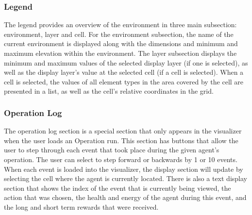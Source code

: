 \subsubsection{Legend}
The legend provides an overview of the environment in three main subsection: environment, layer and cell.
For the environment subsection, the name of the current environment is displayed along with the dimensions and minimum and maximum elevation within the environment.
The layer subsection displays the minimum and maximum values of the selected display layer (if one is selected), as well as the display layer's value at the selected cell (if a cell is selected).
When a cell is selected, the values of all element types in the area covered by the cell are presented in a list, as well as the cell's relative coordinates in the grid.


\subsubsection{Operation Log}
The operation log section is a special section that only appears in the visualizer when the user loads an Operation run.
This section has buttons that allow the user to step through each event that took place during the given agent's operation.
The user can select to step forward or backwards by 1 or 10 events.
When each event is loaded into the visualizer, the display section will update by selecting the cell where the agent is currently located.
There is also a text display section that shows the index of the event that is currently being viewed, the action that was chosen, the health and energy of the agent during this event, and the long and short term rewards that were received.
